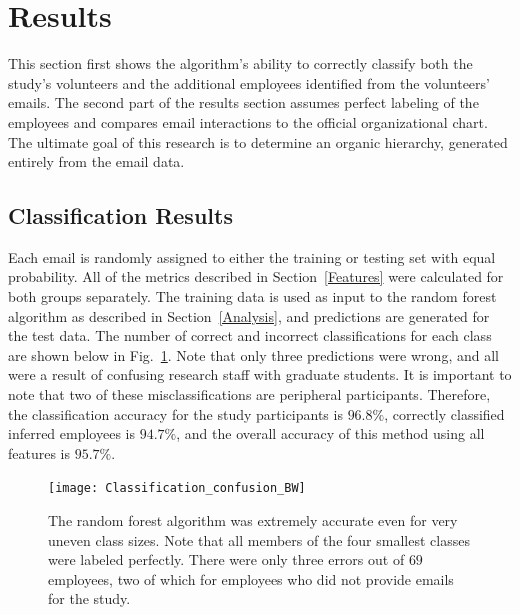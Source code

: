 \documentclass[10pt,twocolumn,conference]{IEEEtran}
\begin{document}
\section{Results} \label{Results}
This section first shows the algorithm's ability to correctly classify both the study's volunteers and the additional employees identified from the volunteers' emails.
The second part of the results section assumes perfect labeling of the employees and compares email interactions to the official organizational chart.
The ultimate goal of this research is to determine an organic hierarchy, generated entirely from the email data.

\subsection{Classification Results}\label{ssec:class_results}
Each email is randomly assigned to either the training or testing set with equal probability.
All of the metrics described in Section~\ref{Features} were calculated for both groups separately.
The training data is used as input to the random forest algorithm as described in Section~\ref{Analysis}, and predictions are generated for the test data.
The number of correct and incorrect classifications for each class are shown below in Fig.~\ref{fig:result_hist}.
Note that only three predictions were wrong, and all were a result of confusing research staff with graduate students.
It is important to note that two of these misclassifications are peripheral participants.
Therefore, the classification accuracy for the study participants is $96.8\%$, correctly classified inferred employees is $94.7\%$, and the overall accuracy of this method using all features is $95.7\%$.

\begin{figure}[t]
    \centering
    \texttt{[image: Classification\_confusion\_BW]}
    \caption{The random forest algorithm was extremely accurate even for very uneven class sizes.  Note that all members of the four smallest classes were labeled perfectly.  There were only three errors out of $69$ employees, two of which for employees who did not provide emails for the study.}
    \label{fig:result_hist}
\end{figure}
\end{document}
